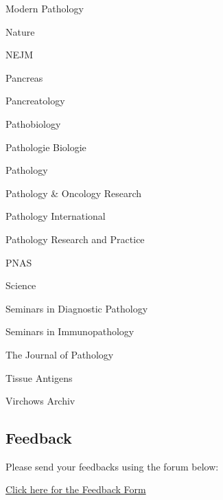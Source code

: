 \documentclass[]{article}
\begin{document}
Modern Pathology

Nature

NEJM

Pancreas

Pancreatology

Pathobiology

Pathologie Biologie

Pathology

Pathology \& Oncology Research

Pathology International

Pathology Research and Practice

PNAS

Science

Seminars in Diagnostic Pathology

Seminars in Immunopathology

The Journal of Pathology

Tissue Antigens

Virchows Archiv

\hypertarget{feedback}{%
\subsection{Feedback}\label{feedback}}

Please send your feedbacks using the forum below:

\href{https://docs.google.com/forms/d/e/1FAIpQLSeD3Z9J6Y7eMmiyM12f_SfAmHUlykb1zxZcwO6lg7cebGYQIQ/viewform}{Click
here for the Feedback Form}
\end{document}
